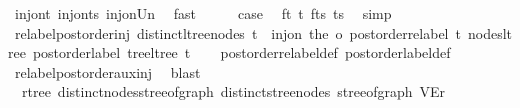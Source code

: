 \begin{isabellebody}
\ inj{\isacharunderscore}{\kern0pt}on{\isacharunderscore}{\kern0pt}t{\isacharprime}{\kern0pt}\ inj{\isacharunderscore}{\kern0pt}on{\isacharunderscore}{\kern0pt}ts{\isacharprime}{\kern0pt}\ inj{\isacharunderscore}{\kern0pt}on{\isacharunderscore}{\kern0pt}Un\ \isamarkupfalse%
\ fast\isanewline
\ \ \isamarkupfalse%
\ \isamarkupfalse%
\ {\isacharquery}{\kern0pt}case\ \isamarkupfalse%
\ f{\isacharunderscore}{\kern0pt}t\ t{\isacharprime}{\kern0pt}\ f{\isacharunderscore}{\kern0pt}ts\ ts{\isacharprime}{\kern0pt}\ \isamarkupfalse%
\ simp\isanewline
{}\isamarkupfalse%
%
\endisatagproof
{\isafoldproof}%
%
\isadelimproof
\isanewline
%
\endisadelimproof
\isanewline
{}\isamarkupfalse%
\ relabel{\isacharunderscore}{\kern0pt}postorder{\isacharunderscore}{\kern0pt}inj{\isacharcolon}{\kern0pt}\ {\isachardoublequoteopen}distinct{\isacharunderscore}{\kern0pt}ltree{\isacharunderscore}{\kern0pt}nodes\ t\ {\isasymLongrightarrow}\ inj{\isacharunderscore}{\kern0pt}on\ {\isacharparenleft}{\kern0pt}the\ o\ postorder{\isacharunderscore}{\kern0pt}relabel\ t{\isacharparenright}{\kern0pt}\ {\isacharparenleft}{\kern0pt}nodes{\isacharunderscore}{\kern0pt}ltree\ {\isacharparenleft}{\kern0pt}postorder{\isacharunderscore}{\kern0pt}label\ {\isacharparenleft}{\kern0pt}tree{\isacharunderscore}{\kern0pt}ltree\ t{\isacharparenright}{\kern0pt}{\isacharparenright}{\kern0pt}{\isacharparenright}{\kern0pt}{\isachardoublequoteclose}\isanewline
%
\isadelimproof
\ \ %
\endisadelimproof
%
\isatagproof
{}\isamarkupfalse%
\ postorder{\isacharunderscore}{\kern0pt}relabel{\isacharunderscore}{\kern0pt}def\ postorder{\isacharunderscore}{\kern0pt}label{\isacharunderscore}{\kern0pt}def\ \isamarkupfalse%
\ relabel{\isacharunderscore}{\kern0pt}postorder{\isacharunderscore}{\kern0pt}aux{\isacharunderscore}{\kern0pt}inj\ \isamarkupfalse%
\ blast%
\endisatagproof
{\isafoldproof}%
%
\isadelimproof
\isanewline
%
\endisadelimproof
\isanewline
{}\isamarkupfalse%
\ {\isacharparenleft}{\kern0pt}\ rtree{\isacharparenright}{\kern0pt}\ distinct{\isacharunderscore}{\kern0pt}nodes{\isacharunderscore}{\kern0pt}stree{\isacharunderscore}{\kern0pt}of{\isacharunderscore}{\kern0pt}graph{\isacharcolon}{\kern0pt}\ {\isachardoublequoteopen}distinct{\isacharunderscore}{\kern0pt}stree{\isacharunderscore}{\kern0pt}nodes\ {\isacharparenleft}{\kern0pt}stree{\isacharunderscore}{\kern0pt}of{\isacharunderscore}{\kern0pt}graph\ {\isacharparenleft}{\kern0pt}V{\isacharcomma}{\kern0pt}E{\isacharcomma}{\kern0pt}r{\isacharparenright}{\kern0pt}{\isacharparenright}{\kern0pt}{\isachardoublequoteclose}\isanewline

\end{isabellebody}
